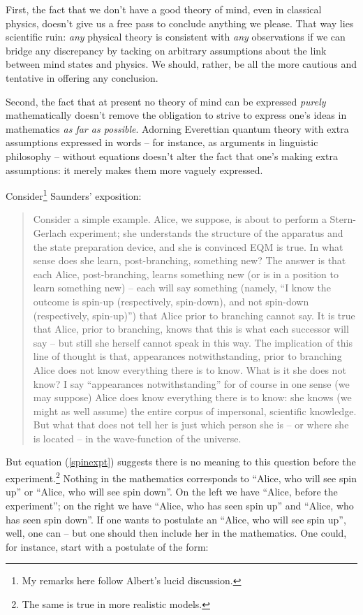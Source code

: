 \documentclass[aps,
pra,epsfig]{revtex4}
\begin{document}
First, the fact that we don't 
have a good theory of mind, even in classical physics, doesn't give 
us a free pass to conclude anything we please.   That way lies 
scientific ruin: {\it any} physical theory is consistent with
{\it any} observations if we can bridge any discrepancy 
by tacking on arbitrary assumptions about the link between mind 
states and physics.   We should, rather, be 
all the more cautious and tentative in offering any conclusion.  

Second, the fact that at present no theory of mind can be expressed {\it purely}
mathematically doesn't remove the obligation to strive to express
one's ideas in mathematics {\it as far as possible}.   
Adorning Everettian quantum theory 
with extra assumptions expressed in words -- for instance, as arguments in
linguistic philosophy -- without equations doesn't
alter the fact that one's making extra assumptions: it merely makes 
them more vaguely expressed.  

Consider\footnote{My remarks here follow
Albert's lucid discussion\cite{albertvol}.}
Saunders' exposition\cite{saundersvol}:

\begin{quotation}
Consider a simple example. Alice, we suppose, is about
to perform a Stern-Gerlach experiment; she understands the structure of the
apparatus and the state preparation device, and she is convinced EQM is true.
In what sense does she learn, post-branching, something new? The answer is
that each Alice, post-branching, learns something new (or is in a position to
learn something new) -- each will say something (namely, ``I know the outcome
is spin-up (respectively, spin-down), and not spin-down 
(respectively, spin-up)'') that Alice prior to branching cannot say. 
It is true that Alice, prior to branching, 
knows that this is what each successor will say -- but 
still she herself cannot speak
in this way.
The implication of this line of thought is that, appearances notwithstanding,
prior to branching Alice does not know everything there is to know. What is it
she does not know? I say ``appearances notwithstanding'' for of course in one
sense (we may suppose) Alice does know everything there is to know: she knows
(we might as well assume) the entire corpus of impersonal, scientific knowledge.
But what that does not tell her is just which person she is -- 
or where she is located -- in the wave-function of the universe.
\end{quotation}

But equation (\ref{spinexpt}) suggests there is
no meaning to this question before the 
experiment.\footnote{The same is true in more realistic
models.}
Nothing in the mathematics corresponds to ``Alice, 
who will see spin up'' or ``Alice, who will
see spin down''.  On the left we have  
``Alice, before the experiment''; on the right we have 
``Alice, who has seen spin up'' and ``Alice, who has seen spin down''. 
If one wants to postulate an ``Alice, who will see spin up'', well, 
one can -- but one should then include her in 
the mathematics.
One could, for instance, start with a postulate of the form:
\end{document}
